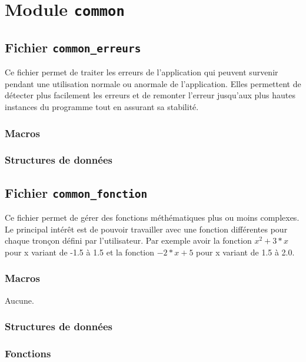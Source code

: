 \documentclass{article}
\begin{document}
\section{Module {\texttt{common}}}
\subsection{Fichier {\texttt{common\_erreurs}}}
Ce fichier permet de traiter les erreurs de l'application qui peuvent survenir pendant une utilisation normale ou anormale de l'application. Elles permettent de détecter plus facilement les erreurs et de remonter l'erreur jusqu'aux plus hautes instances du programme tout en assurant sa stabilité.
\subsubsection{Macros}


\subsubsection{Structures de données}
\subsection{Fichier {\texttt{common\_fonction}}}
Ce fichier permet de gérer des fonctions méthématiques plus ou moins complexes. Le principal intérêt est de pouvoir travailler avec une fonction différentes pour chaque tronçon défini par l'utilisateur. Par exemple avoir la fonction $x^2+3*x$ pour x variant de -1.5 à 1.5 et la fonction $-2*x+5$ pour x variant de 1.5 à 2.0.
\subsubsection{Macros}
Aucune.
\subsubsection{Structures de données}


\subsubsection{Fonctions}
\noindent\hrulefill










\end{document}
